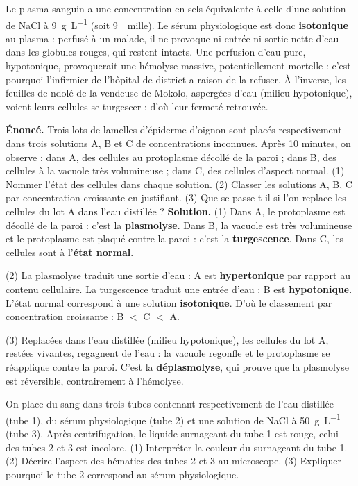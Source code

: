 \documentclass[11pt]{article}
\newcommand{\cle}[1]{{\popxbold\color{popdark}#1}}
\begin{document}
\begin{savaistu}
Le plasma sanguin a une concentration en sels équivalente à celle d'une solution de NaCl à \SI{9}{g.L^{-1}} (soit \SI{9}{\per mille}). Le \cle{sérum physiologique} est donc \textbf{isotonique} au plasma : perfusé à un malade, il ne provoque ni entrée ni sortie nette d'eau dans les globules rouges, qui restent intacts. Une perfusion d'eau pure, hypotonique, provoquerait une hémolyse massive, potentiellement mortelle : c'est pourquoi l'infirmier de l'hôpital de district a raison de la refuser. À l'inverse, les feuilles de ndolé de la vendeuse de Mokolo, aspergées d'eau (milieu hypotonique), voient leurs cellules se turgescer : d'où leur fermeté retrouvée.
\end{savaistu}

\begin{exoresolu}
\textbf{Énoncé.} Trois lots de lamelles d'épiderme d'oignon sont placés respectivement dans trois solutions A, B et C de concentrations inconnues. Après 10 minutes, on observe : dans A, des cellules au protoplasme décollé de la paroi ; dans B, des cellules à la vacuole très volumineuse ; dans C, des cellules d'aspect normal. (1) Nommer l'état des cellules dans chaque solution. (2) Classer les solutions A, B, C par concentration croissante en justifiant. (3) Que se passe-t-il si l'on replace les cellules du lot A dans l'eau distillée ?
\tcblower
\textbf{Solution.} (1) Dans A, le protoplasme est décollé de la paroi : c'est la \textbf{plasmolyse}. Dans B, la vacuole est très volumineuse et le protoplasme est plaqué contre la paroi : c'est la \textbf{turgescence}. Dans C, les cellules sont à l'\textbf{état normal}.

(2) La plasmolyse traduit une sortie d'eau : A est \textbf{hypertonique} par rapport au contenu cellulaire. La turgescence traduit une entrée d'eau : B est \textbf{hypotonique}. L'état normal correspond à une solution \textbf{isotonique}. D'où le classement par concentration croissante : B $<$ C $<$ A.

(3) Replacées dans l'eau distillée (milieu hypotonique), les cellules du lot A, restées vivantes, regagnent de l'eau : la vacuole regonfle et le protoplasme se réapplique contre la paroi. C'est la \textbf{déplasmolyse}, qui prouve que la plasmolyse est réversible, contrairement à l'hémolyse.
\end{exoresolu}

\begin{exercice}
On place du sang dans trois tubes contenant respectivement de l'eau distillée (tube 1), du sérum physiologique (tube 2) et une solution de NaCl à \SI{50}{g.L^{-1}} (tube 3). Après centrifugation, le liquide surnageant du tube 1 est rouge, celui des tubes 2 et 3 est incolore. (1) Interpréter la couleur du surnageant du tube 1. (2) Décrire l'aspect des hématies des tubes 2 et 3 au microscope. (3) Expliquer pourquoi le tube 2 correspond au sérum physiologique.
\end{exercice}
\end{document}
